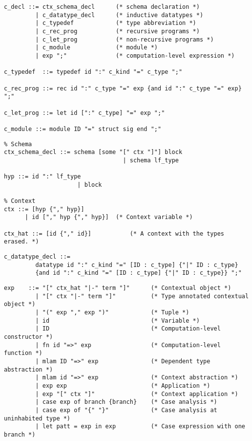 \documentclass[11pt]{article}
\begin{document}
\begin{verbatim}
c_decl ::= ctx_schema_decl      (* schema declaration *)
         | c_datatype_decl      (* inductive datatypes *)
         | c_typedef            (* type abbreviation *)
         | c_rec_prog           (* recursive programs *)
         | c_let_prog           (* non-recursive programs *)
         | c_module             (* module *)
         | exp ";"              (* computation-level expression *)

c_typedef  ::= typedef id ":" c_kind "=" c_type ";"

c_rec_prog ::= rec id ":" c_type "=" exp {and id ":" c_type "=" exp} ";"

c_let_prog ::= let id [":" c_type] "=" exp ";"

c_module ::= module ID "=" struct sig end ";"
\end{verbatim}

\begin{verbatim}
% Schema
ctx_schema_decl ::= schema [some "[" ctx "]"] block
                                  | schema lf_type

hyp ::= id ":" lf_type 
                     | block

% Context
ctx ::= [hyp {"," hyp}]
      | id ["," hyp {"," hyp}]  (* Context variable *)

ctx_hat ::= [id {"," id}]           (* A context with the types erased. *)
\end{verbatim}

\begin{verbatim}
c_datatype_decl ::=
         datatype id ":" c_kind "=" [ID : c_type] {"|" ID : c_type}
         {and id ":" c_kind "=" [ID : c_type] {"|" ID : c_type}} ";"
\end{verbatim}

\begin{verbatim}
exp    ::= "[" ctx_hat "|-" term "]"      (* Contextual object *)
         | "[" ctx "|-" term "]"          (* Type annotated contextual object *)
         | "(" exp "," exp ")"            (* Tuple *)
         | id                             (* Variable *)
         | ID                             (* Computation-level constructor *)
         | fn id "=>" exp                 (* Computation-level function *)
         | mlam ID "=>" exp               (* Dependent type abstraction *)
         | mlam id "=>" exp               (* Context abstraction *)
         | exp exp                        (* Application *)
         | exp "[" ctx "]"                (* Context application *)
         | case exp of branch {branch}    (* Case analysis *)
         | case exp of "{" "}"            (* Case analysis at uninhabited type *)
         | let patt = exp in exp          (* Case expression with one branch *)

\end{verbatim}
\end{document}
